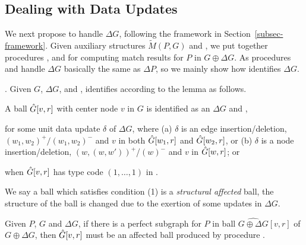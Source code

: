 \subsection{Dealing with Data Updates}
\label{subsec-Ginc}

We next propose \incd to handle $\Delta G$, following the framework in Section~\ref{subsec-framework}.
Given auxiliary structures $\tilde{M}(P,G)$ and \fb,
we put together procedures \identifyaffball, \incmatch and \comb for computing match results for $P$ in $G \oplus \Delta G$.
%
As procedures \incmatch and \comb handle $\Delta G$ basically the same as $\Delta P$, so we mainly show how \identifyaffball identifies \affballsx \wrt $\Delta G$.


.
Given $G$, $\Delta G$, and \fb, \identifyaffball identifies \affballsx according to the lemma as follows.

\begin{lemma}
\label{lemma-incgrdata-affballs}
A ball $\hat{G}{[v,r]}$ with center node $v$ in $G$ is identified as an \affballx \wrt $\Delta G$ and \fb,

 for some unit data update $\delta$ of $\Delta G$, where
(a) $\delta$ is an edge insertion/deletion, $(w_1,w_2)^+/(w_1,w_2)^-$ and $v$ in  both $\hat{G}{[w_1,r]}$  and $\hat{G}{[w_2,r]}$, or
(b) $\delta$ is a node insertion/deletion, $(w,(w,w'))^+$/$(w)^-$ and $v$ in $\hat{G}{[w,r]}$; or

 when $\hat{G}{[v,r]}$ has type code $(1,\ldots,1)$  in \fb.
\end{lemma}

We say a ball which satisfies condition (1) is a {\em structural affected} ball,
\ie the structure of the ball is changed due to the exertion of some updates in $\Delta G$.

\vspace{-0.5ex}
\begin{prop}
\label{prop-affected-datainc}
Given $P$, $G$ and $\Delta G$, if there is a perfect subgraph for $P$ in  ball $\widehat{G\oplus\Delta G}{[v,r]}$ of $G\oplus \Delta G$,
then $\hat{G}{[v,r]}$ must be an affected ball produced by procedure \identifyaffball.
\end{prop}


